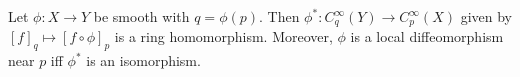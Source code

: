 Let $\phi: X \to Y$ be smooth with $q = \phi(p)$. Then $\phi^*: C_q^\infty(Y) \to C_p^\infty(X)$ given by $[f]_q \mapsto [f \circ \phi]_p$ is a ring homomorphism. Moreover, $\phi$ is a local diffeomorphism near $p$ iff $\phi^*$ is an isomorphism.
